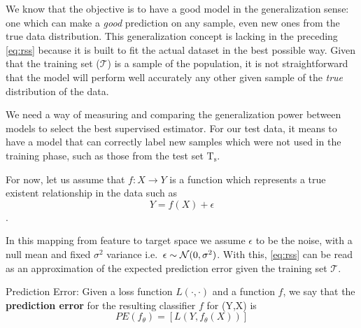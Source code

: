 
We know that the objective is to have a good model in the generalization sense: one which can make a \textit{good} prediction on any sample, even new ones from the true data distribution.
This generalization concept is lacking in the preceding \cref{eq:rss} because it is built to fit the actual dataset in the best possible way.
Given that the training set ($\mathcal{T}$) is a sample of the population, it is not straightforward that the model will perform well accurately any other given sample of the \textit{true} distribution of the data.

We need a way of measuring and comparing the generalization power between models to select the best supervised estimator.
For our test data, it means to have a model that can correctly label new samples which were not used in the training phase, such as those from the test set $\mathrm{T_s}$.


For now, let us assume that $f: X \rightarrow Y$ is a function which represents a true existent relationship in the data such as
$$Y = f(X) + \epsilon$$.

In this mapping from feature to target space we assume $\epsilon$ to be the noise, with a null mean and fixed $\sigma^2$ variance i.e.\ $\epsilon \sim \operatorname{\mathcal{N}}(0,\sigma^2)$.
With this, \cref{eq:rss} can be read as an approximation of the expected prediction error given the training set $\mathcal{T}$.

%


\begin{definition}{Prediction Error:}
	Given a loss function $L(\cdot,\cdot)$ and a function $f$, we say that the \textbf{prediction error} for the resulting classifier $f$ for (Y,X) is
	\[
	PE(f_\theta)= \left[ L(Y,f_\theta(X))\right]
	\]
\end{definition}


